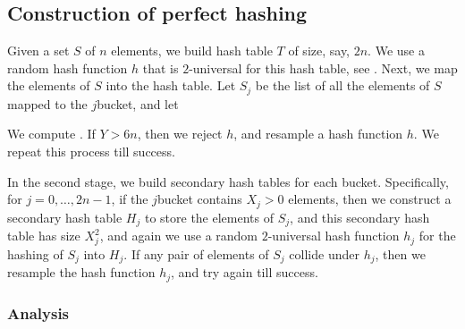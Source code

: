 \subsection{Construction of perfect hashing}

Given a set $S$ of $n$ elements, we build  hash table $T$ of
size, say, $2n$. We use a random hash function $h$ that is
$2$-universal for this hash table, see . Next,
we map the elements of $S$ into the hash table.  Let $S_j$ be the list
of all the elements of $S$ mapped to the $j$\th bucket, and let

We compute . If $Y > 6n$, then we reject $h$,
and resample a hash function $h$. We repeat this process till success.

In the second stage, we build secondary hash tables for each bucket.
Specifically, for $j=0,\ldots, 2n-1$, if the $j$\th bucket contains
$X_j > 0$ elements, then we construct a secondary hash table $H_j$ to
store the elements of $S_j$, and this secondary hash table has size
$X_j^2$, and again we use a random $2$-universal hash function $h_j$
for the hashing of $S_j$ into $H_j$. If any pair of elements of $S_j$
collide under $h_j$, then we resample the hash function $h_j$, and try
again till success.

\subsubsection{Analysis}


